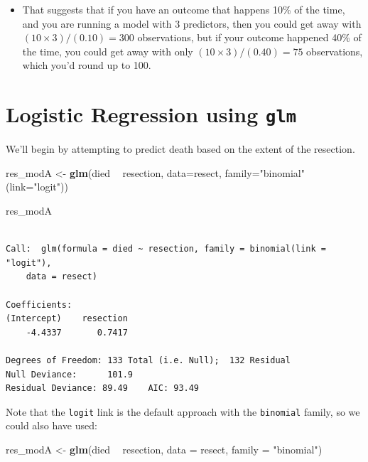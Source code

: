 \documentclass[]{book}
\newenvironment{Shaded}{\begin{snugshade}}{\end{snugshade}}
\newcommand{\KeywordTok}[1]{\textcolor[rgb]{0.13,0.29,0.53}{\textbf{#1}}}
\newcommand{\DataTypeTok}[1]{\textcolor[rgb]{0.13,0.29,0.53}{#1}}
\newcommand{\StringTok}[1]{\textcolor[rgb]{0.31,0.60,0.02}{#1}}
\newcommand{\OperatorTok}[1]{\textcolor[rgb]{0.81,0.36,0.00}{\textbf{#1}}}
\newcommand{\NormalTok}[1]{#1}
\providecommand{\tightlist}{%
  \setlength{\itemsep}{0pt}\setlength{\parskip}{0pt}}
\theoremstyle{definition}
\theoremstyle{definition}
\theoremstyle{definition}
\theoremstyle{remark}
\begin{document}
\begin{itemize}
\begin{itemize}
    \begin{itemize}
    \tightlist
    \item
      That suggests that if you have an outcome that happens 10\% of the
      time, and you are running a model with 3 predictors, then you
      could get away with \((10 \times 3)/(0.10) = 300\) observations,
      but if your outcome happened 40\% of the time, you could get away
      with only \((10 \times 3)/(0.40) = 75\) observations, which you'd
      round up to 100.
    \end{itemize}
  \end{itemize}
\end{itemize}

\section{\texorpdfstring{Logistic Regression using
\texttt{glm}}{Logistic Regression using glm}}\label{logistic-regression-using-glm}

We'll begin by attempting to predict death based on the extent of the
resection.

\begin{Shaded}
\begin{Highlighting}[]
\NormalTok{res_modA <-}\StringTok{ }\KeywordTok{glm}\NormalTok{(died }\OperatorTok{~}\StringTok{ }\NormalTok{resection, }\DataTypeTok{data=}\NormalTok{resect, }
               \DataTypeTok{family=}\StringTok{"binomial"}\NormalTok{(}\DataTypeTok{link=}\StringTok{"logit"}\NormalTok{))}

\NormalTok{res_modA}
\end{Highlighting}
\end{Shaded}

\begin{verbatim}

Call:  glm(formula = died ~ resection, family = binomial(link = "logit"), 
    data = resect)

Coefficients:
(Intercept)    resection  
    -4.4337       0.7417  

Degrees of Freedom: 133 Total (i.e. Null);  132 Residual
Null Deviance:      101.9 
Residual Deviance: 89.49    AIC: 93.49
\end{verbatim}

Note that the \texttt{logit} link is the default approach with the
\texttt{binomial} family, so we could also have used:

\begin{Shaded}
\begin{Highlighting}[]
\NormalTok{res_modA <-}\StringTok{ }\KeywordTok{glm}\NormalTok{(died }\OperatorTok{~}\StringTok{ }\NormalTok{resection, }\DataTypeTok{data =}\NormalTok{ resect, }
                \DataTypeTok{family =} \StringTok{"binomial"}\NormalTok{)}
\end{Highlighting}
\end{Shaded}
\end{document}
